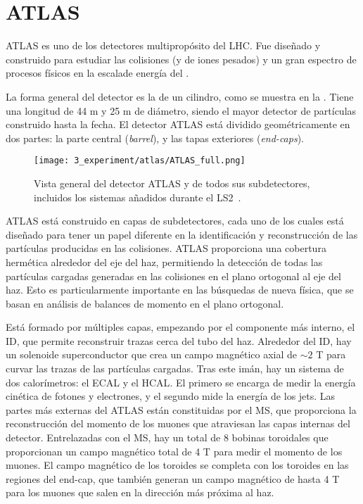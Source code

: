 \FloatBarrier
\section{ATLAS}
\label{sec:atlas:atlas}

\ac{ATLAS} es uno de los detectores multipropósito del \ac{LHC}. Fue diseñado y construido para estudiar las colisiones \pp (y de iones pesados) y un gran espectro de procesos f\'isicos en la escalade energ\'ia del \tev.

La forma general del detector es la de un cilindro, como se muestra en la \Fig{\ref{fig:atlas:atlas:atlas}}. Tiene una longitud de 44 m y 25 m de diámetro, siendo el mayor detector de partículas construido hasta la fecha. El detector \ac{ATLAS} está dividido geométricamente en dos partes: la parte central (\textit{barrel}), y las tapas exteriores (\textit{end-caps}).

\begin{figure}[ht!]
    \centering
    \texttt{[image: 3\_experiment/atlas/ATLAS\_full.png]}
    \caption{Vista general del detector \ac{ATLAS} y de todos sus subdetectores, incluidos los sistemas añadidos durante el \ac{LS2}~\cite{ATLAS-Diagram}.}
    \label{fig:atlas:atlas:atlas}
\end{figure}

\ac{ATLAS} está construido en capas de subdetectores, cada uno de los cuales está diseñado para tener un papel diferente en la identificación y reconstrucción de las partículas producidas en las colisiones. \ac{ATLAS} proporciona una cobertura hermética alrededor del eje del haz, permitiendo la detección de todas las partículas cargadas generadas en las colisiones en el plano ortogonal al eje del haz. Esto es particularmente importante en las búsquedas de nueva física, que se basan en análisis de balances de momento en el plano ortogonal.

Está formado por múltiples capas, empezando por el componente más interno, el \acf{ID}, que permite reconstruir trazas cerca del tubo del haz. Alrededor del \ac{ID}, hay un solenoide superconductor que crea un campo magnético axial de \(\sim 2\) T para curvar las trazas de las partículas cargadas.
Tras este imán, hay un sistema de dos calorímetros: el \acf{ECAL} y el \acf{HCAL}. El primero se encarga de medir la energía cinética de fotones y electrones, y el segundo mide la energía de los jets.
Las partes más externas del \ac{ATLAS} están constituidas por el \acf{MS}, que proporciona la reconstrucción del momento de los muones que atraviesan las capas internas del detector. Entrelazadas con el \ac{MS}, hay un total de 8 bobinas toroidales que proporcionan un campo magnético total de 4 T para medir el momento de los muones. El campo magnético de los toroides se completa con los toroides en las regiones del end-cap, que también generan un campo magnético de hasta 4 T para los muones que salen en la direcci\'on m\'as pr\'oxima al haz.


